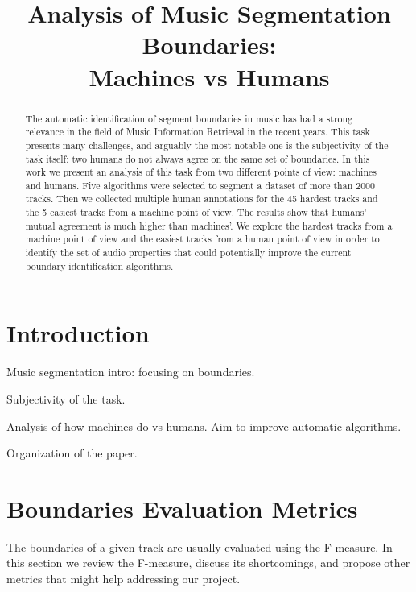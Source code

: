 \documentclass{article}
\title{Analysis of Music Segmentation Boundaries:\\ Machines vs Humans}
\begin{document}
%
\maketitle
%
\begin{abstract}
  The automatic identification of segment boundaries in music has had a strong relevance in the field of Music Information Retrieval in the recent years.
  This task presents many challenges, and arguably the most notable one is the subjectivity of the task itself: two humans do not always agree on the same set of boundaries.
  In this work we present an analysis of this task from two different points of view: machines and humans.
  Five algorithms were selected to segment a dataset of more than 2000 tracks.
  Then we collected multiple human annotations for the 45 hardest tracks and the 5 easiest tracks from a machine point of view.
  The results show that humans' mutual agreement is much higher than machines'.
  We explore the hardest tracks from a machine point of view and the easiest tracks from a human point of view in order to identify the set of audio properties that could potentially improve the current boundary identification algorithms.
  
\end{abstract}
%
\section{Introduction}\label{sec:introduction}

Music segmentation intro: focusing on boundaries.

Subjectivity of the task.

Analysis of how machines do vs humans. Aim to improve automatic algorithms.

Organization of the paper.

\section{Boundaries Evaluation Metrics}

The boundaries of a given track are usually evaluated using the F-measure. In this section we review the F-measure, discuss its shortcomings, and propose other metrics that might help addressing our project.
\end{document}
